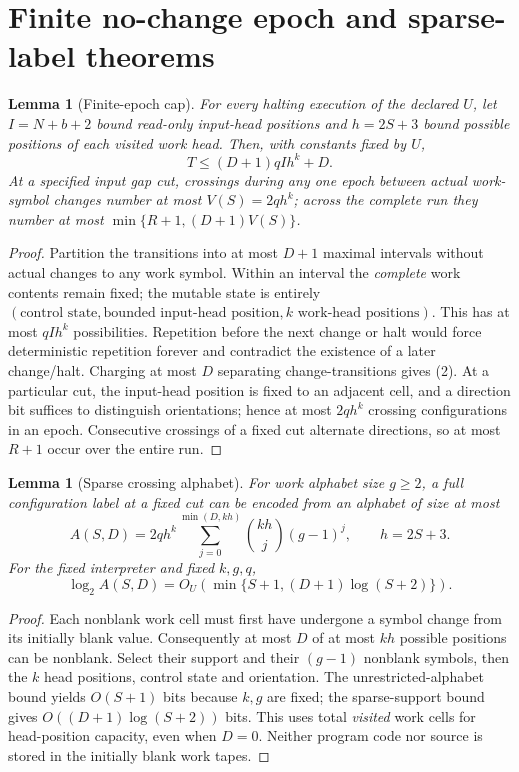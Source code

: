 \documentclass[11pt]{article}
\newtheorem{lemma}[theorem]{Lemma}
\begin{document}
\section{Finite no-change epoch and sparse-label theorems}
\begin{lemma}[Finite-epoch cap]\label{lem:epoch}
For every \emph{halting} execution of the declared $U$, let
$I=N+b+2$ bound read-only input-head positions and
$h=2S+3$ bound possible positions of each visited work head.
Then, with constants fixed by $U$,
\[
 \boxed{T\le (D+1)qIh^k+D.} \tag{2}
\]
At a specified input gap cut, crossings during any one epoch
between actual work-symbol changes number at most
$V(S)=2qh^k$; across the complete run they number at most
$\min\{R+1,(D+1)V(S)\}$.
\end{lemma}
\begin{proof}
Partition the transitions into at most $D+1$ maximal intervals
without actual changes to any work symbol. Within an interval
the \emph{complete} work contents remain fixed; the mutable
state is entirely $(\text{control state},\text{bounded input-head
position},k\text{ work-head positions})$. This has at most
$qIh^k$ possibilities. Repetition before the next change or
halt would force deterministic repetition forever and contradict
the existence of a later change/halt. Charging at most $D$
separating change-transitions gives (2). At a particular cut,
the input-head position is fixed to an adjacent cell, and a
direction bit suffices to distinguish orientations; hence at
most $2qh^k$ crossing configurations in an epoch. Consecutive
crossings of a fixed cut alternate directions, so at most
$R+1$ occur over the entire run.
\end{proof}

\begin{lemma}[Sparse crossing alphabet]\label{lem:sparse}
For work alphabet size $g\ge2$, a full configuration label at
a fixed cut can be encoded from an alphabet of size at most
\[
 \boxed{A(S,D)=2qh^k
 \sum_{j=0}^{\min(D,kh)}\binom{kh}{j}(g-1)^j},\qquad h=2S+3.
 \tag{3}
\]
For the fixed interpreter and fixed $k,g,q$,
\[
 \log_2A(S,D)
 =O_U\!\left(\min\{S+1,(D+1)\log(S+2)\}\right).\tag{4}
\]
\end{lemma}
\begin{proof}
Each nonblank work cell must first have undergone a symbol
change from its initially blank value. Consequently at most
$D$ of at most $kh$ possible positions can be nonblank.
Select their support and their $(g-1)$ nonblank symbols,
then the $k$ head positions, control state and orientation.
The unrestricted-alphabet bound yields $O(S+1)$ bits because
$k,g$ are fixed; the sparse-support bound gives
$O((D+1)\log(S+2))$ bits. This uses total
\emph{visited} work cells for head-position capacity, even
when $D=0$. Neither program code nor source is stored in
the initially blank work tapes.
\end{proof}
\end{document}
